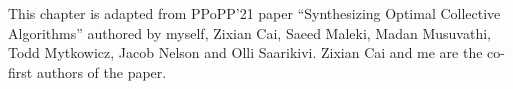 \newcommand{\broadcasting}{non-com\-bin\-ing\xspace}
\newcommand{\broadcastingCap}{Non-com\-bin\-ing\xspace}
\newcommand{\reducing}{com\-bin\-ing\xspace}
\newcommand{\reducingCap}{Com\-bin\-ing\xspace}

\newcommand{\etal}{\textit{et al}.}

This chapter is adapted from PPoPP'21 paper ``Synthesizing Optimal
Collective Algorithms'' authored by myself, Zixian Cai, Saeed Maleki,
Madan Musuvathi, Todd Mytkowicz, Jacob Nelson and Olli Saarikivi.
Zixian Cai and me are the co-first authors of the paper.








